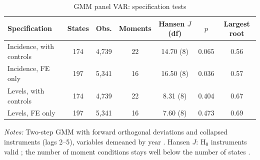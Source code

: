 \begin{table}[htbp]
\centering
\small
\caption{GMM panel VAR: specification tests}
\label{tab:gmm}
\begin{threeparttable}
\begin{tabular}{lcccccc}
\toprule
Specification & States & Obs. & Moments & Hansen $J$ (df) & $p$ & Largest root \\
\midrule
Incidence, with controls & 174 & 4,739 & 22 & 14.70 (8) & 0.065 & 0.56 \\
Incidence, FE only & 197 & 5,341 & 16 & 16.50 (8) & 0.036 & 0.57 \\
Levels, with controls & 174 & 4,739 & 22 & 8.31 (8) & 0.404 & 0.67 \\
Levels, FE only & 197 & 5,341 & 16 & 7.60 (8) & 0.473 & 0.69 \\
\bottomrule
\end{tabular}
\begin{tablenotes}[flushleft]\footnotesize
\item \textit{Notes:} Two-step GMM with forward orthogonal deviations and collapsed instruments (lags 2--5), variables demeaned by year \citep{abrigo2016}. Hansen $J$: H$_0$ instruments valid \citep{hansen1982}; the number of moment conditions stays well below the number of states \citep{roodman2009}.
\end{tablenotes}
\end{threeparttable}
\end{table}

